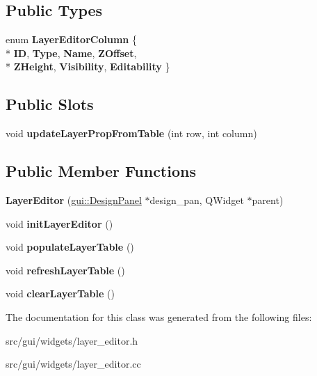 \subsection*{Public Types}
\begin{DoxyCompactItemize}
\item 
enum {\bfseries Layer\+Editor\+Column} \{ \\*
{\bfseries ID}, 
{\bfseries Type}, 
{\bfseries Name}, 
{\bfseries Z\+Offset}, 
\\*
{\bfseries Z\+Height}, 
{\bfseries Visibility}, 
{\bfseries Editability}
 \}\hypertarget{classgui_1_1LayerEditor_acf7c44967be070a9cfd9edabeb3f59f2}{}\label{classgui_1_1LayerEditor_acf7c44967be070a9cfd9edabeb3f59f2}

\end{DoxyCompactItemize}
\subsection*{Public Slots}
\begin{DoxyCompactItemize}
\item 
void {\bfseries update\+Layer\+Prop\+From\+Table} (int row, int column)\hypertarget{classgui_1_1LayerEditor_ab8f31f99f6e9126a61b8feed53dbce69}{}\label{classgui_1_1LayerEditor_ab8f31f99f6e9126a61b8feed53dbce69}

\end{DoxyCompactItemize}
\subsection*{Public Member Functions}
\begin{DoxyCompactItemize}
\item 
{\bfseries Layer\+Editor} (\hyperlink{classgui_1_1DesignPanel}{gui\+::\+Design\+Panel} $\ast$design\+\_\+pan, Q\+Widget $\ast$parent)\hypertarget{classgui_1_1LayerEditor_a511786db23603a18dcf595f168a7f96f}{}\label{classgui_1_1LayerEditor_a511786db23603a18dcf595f168a7f96f}

\item 
void {\bfseries init\+Layer\+Editor} ()\hypertarget{classgui_1_1LayerEditor_ac06367a375c392c29ea0429fdbbbbb1e}{}\label{classgui_1_1LayerEditor_ac06367a375c392c29ea0429fdbbbbb1e}

\item 
void {\bfseries populate\+Layer\+Table} ()\hypertarget{classgui_1_1LayerEditor_a9df5339b43e5adb6b0582cc65d2f348f}{}\label{classgui_1_1LayerEditor_a9df5339b43e5adb6b0582cc65d2f348f}

\item 
void {\bfseries refresh\+Layer\+Table} ()\hypertarget{classgui_1_1LayerEditor_ae335b9397855269dcc8027aa9f0ca4bd}{}\label{classgui_1_1LayerEditor_ae335b9397855269dcc8027aa9f0ca4bd}

\item 
void {\bfseries clear\+Layer\+Table} ()\hypertarget{classgui_1_1LayerEditor_ace2817f8b24eaf598269610388b17c5c}{}\label{classgui_1_1LayerEditor_ace2817f8b24eaf598269610388b17c5c}

\end{DoxyCompactItemize}


The documentation for this class was generated from the following files\+:\begin{DoxyCompactItemize}
\item 
src/gui/widgets/layer\+\_\+editor.\+h\item 
src/gui/widgets/layer\+\_\+editor.\+cc\end{DoxyCompactItemize}
